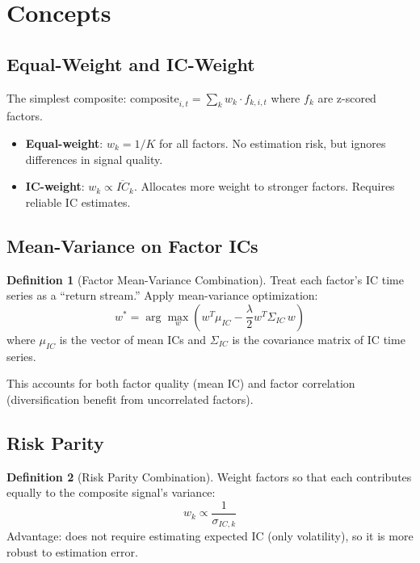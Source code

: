 \documentclass[a4paper, 11pt]{report}
\theoremstyle{definition}
\newtheorem{definition}{Definition}[chapter]
\theoremstyle{remark}
\begin{document}
\section{Concepts}

\subsection{Equal-Weight and IC-Weight}

The simplest composite: $\text{composite}_{i,t} = \sum_k w_k \cdot f_{k,i,t}$
where $f_k$ are z-scored factors.

\begin{itemize}
    \item \textbf{Equal-weight}: $w_k = 1/K$ for all factors.  No estimation
          risk, but ignores differences in signal quality.
    \item \textbf{IC-weight}: $w_k \propto \overline{IC}_k$.  Allocates more
          weight to stronger factors.  Requires reliable IC estimates.
\end{itemize}

\subsection{Mean-Variance on Factor ICs}

\begin{definition}[Factor Mean-Variance Combination]
    Treat each factor's IC time series as a ``return stream.''  Apply
    mean-variance optimization:
    \[
        w^* = \arg\max_w \left( w^T \mu_{IC} - \frac{\lambda}{2}
              w^T \Sigma_{IC}\, w \right)
    \]
    where $\mu_{IC}$ is the vector of mean ICs and $\Sigma_{IC}$ is the
    covariance matrix of IC time series.

    This accounts for both factor quality (mean IC) and factor correlation
    (diversification benefit from uncorrelated factors).
\end{definition}

\subsection{Risk Parity}

\begin{definition}[Risk Parity Combination]
    Weight factors so that each contributes equally to the composite signal's
    variance:
    \[
        w_k \propto \frac{1}{\sigma_{IC,k}}
    \]
    Advantage: does not require estimating expected IC (only volatility), so it
    is more robust to estimation error.
\end{definition}
\end{document}
